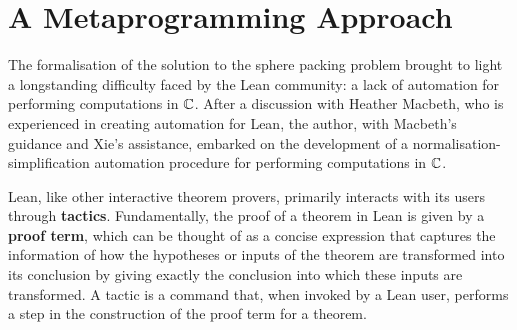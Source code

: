 \section{A Metaprogramming Approach}
\label{Ch5:Sec:Meta}

The formalisation of the solution to the sphere packing problem brought to light a longstanding difficulty faced by the Lean community: a lack of automation for performing computations in $\mathbb{C}$. After a discussion with Heather Macbeth, who is experienced in creating automation for Lean, the author, with Macbeth's guidance and Xie's assistance, embarked on the development of a normalisation-simplification automation procedure for performing computations in $\mathbb{C}$.


Lean, like other interactive theorem provers, primarily interacts with its users through \textbf{tactics}. Fundamentally, the proof of a theorem in Lean is given by a \textbf{proof term}, which can be thought of as a concise expression that captures the information of how the hypotheses or inputs of the theorem are transformed into its conclusion by giving exactly the conclusion into which these inputs are transformed. A tactic is a command that, when invoked by a Lean user, performs a step in the construction of the proof term for a theorem.

